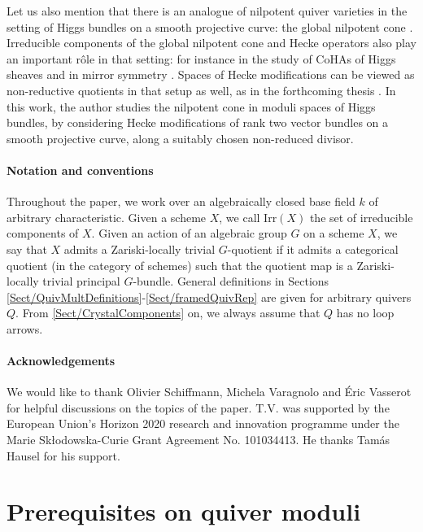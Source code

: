 \documentclass[a4paper,12pt]{article}
\theoremstyle{definition}
\theoremstyle{plain}
\theoremstyle{remark}
\newcommand{\comJ}[1]{\todo[color=cyan!50,inline]{\textbf{Josh:} #1}}
\begin{document}
Let us also mention that there is an analogue of nilpotent quiver varieties in the setting of Higgs bundles on a smooth projective curve: the global nilpotent cone \cite{Lau88}. Irreducible components of the global nilpotent cone and Hecke operators also play an important r\^{o}le in that setting: for instance in the study of CoHAs of Higgs sheaves \cite{Min20,SS20} and in mirror symmetry \cite{HH22}.
Spaces of Hecke modifications can be viewed as non-reductive quotients in that setup as well, as in the forthcoming thesis \cite{Mar26}. In this work, the author studies the nilpotent cone in moduli spaces of Higgs bundles, by considering Hecke modifications of rank two vector bundles on a smooth projective curve, along a suitably chosen non-reduced divisor.

\paragraph*{Notation and conventions}
Throughout the paper, we work over an algebraically closed base field $k$ of arbitrary characteristic. Given a scheme $X$, we call $\mathrm{Irr}(X)$ the set of irreducible components of $X$. Given an action of an algebraic group $G$ on a scheme $X$, we say that $X$ admits a Zariski-locally trivial $G$-quotient if it admits a categorical quotient (in the category of schemes) such that the quotient map is a Zariski-locally trivial principal $G$-bundle. General definitions in Sections \ref{Sect/QuivMultDefinitions}-\ref{Sect/framedQuivRep} are given for arbitrary quivers $Q$. From \cref{Sect/CrystalComponents} on, we always assume that $Q$ has no loop arrows.

\paragraph*{Acknowledgements}
We would like to thank Olivier Schiffmann, Michela Varagnolo and \'{E}ric Vasserot for helpful discussions on the topics of the paper. T.V. was supported by the European Union’s Horizon 2020 research and innovation programme under the Marie Skłodowska-Curie Grant Agreement No. 101034413. He thanks Tam\'{a}s Hausel for his support. 

\section{Prerequisites on quiver moduli}\label{Sect/prerequisitesQuiverModuli}
\end{document}
